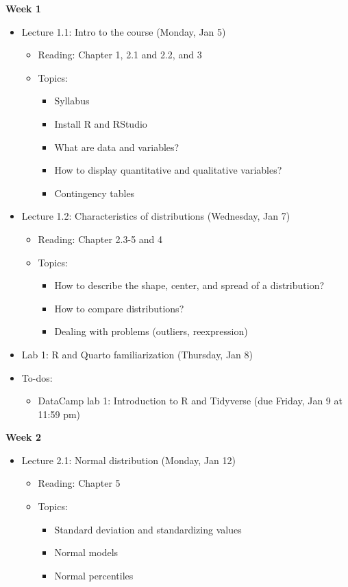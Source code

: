 \documentclass[11pt]{article}
\begin{document}
\large \textbf{Week 1}
\begin{itemize}
    \item Lecture 1.1: Intro to the course (Monday, Jan 5)
    \begin{itemize}
        \item Reading: Chapter 1, 2.1 and 2.2, and 3
        \item Topics:
        \begin{itemize}
            \item Syllabus
            \item Install R and RStudio
            \item What are data and variables?
            \item How to display quantitative and qualitative variables?
            \item Contingency tables
        \end{itemize}
    \end{itemize}
    \item Lecture 1.2: Characteristics of distributions (Wednesday, Jan 7)
    \begin{itemize}
        \item Reading: Chapter 2.3-5 and 4
        \item Topics:
        \begin{itemize}
            \item How to describe the shape, center, and spread of a distribution?
            \item How to compare distributions?
            \item Dealing with problems (outliers, reexpression)
        \end{itemize}
    \end{itemize}
    \item Lab 1: R and Quarto familiarization (Thursday, Jan 8)
    \item To-dos: 
    \begin{itemize}
        \item DataCamp lab 1: Introduction to R and Tidyverse (due Friday, Jan 9 at 11:59 pm)
    \end{itemize}
\end{itemize}



\textbf{Week 2}
\begin{itemize}
    \item Lecture 2.1: Normal distribution (Monday, Jan 12)
    \begin{itemize}
        \item Reading: Chapter 5
        \item Topics: 
        \begin{itemize}
            \item Standard deviation and standardizing values
            \item Normal models
            \item Normal percentiles
        \end{itemize}
    \end{itemize}
\end{itemize}
\end{document}
